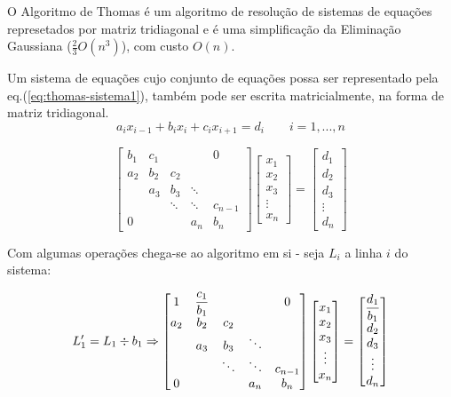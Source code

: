 O Algoritmo de Thomas é um algoritmo de resolução de sistemas de equações represetados por matriz tridiagonal e é uma simplificação da Eliminação Gaussiana ($\frac{2}{3}O(n^3)$), com custo $O(n)$.

Um sistema de equações cujo conjunto de equações possa ser representado pela eq.(\ref{eq:thomas-sistema1}), também pode ser escrita matricialmente, na forma de matriz tridiagonal.
\begin{equation}
\label{eq:thomas-sistema1}
a_i x_{i-1} + b_i x_i + c_i x_{i+1} = d_i \qquad i = 1, ..., n
\end{equation}

\begin{equation*}
	\begin{bmatrix}
		b_1 & c_1 &         &        & 0\\
		a_2 & b_2 &   c_2   &        & \\
		    & a_3 &   b_3   & \ddots & \\
		    &     &  \ddots & \ddots & c_{n-1} \\
	     0  &     &         &  a_n   & b_n 
	\end{bmatrix}
	\begin{bmatrix}
		x_1 \\
		x_2 \\
		x_3 \\
		\vdots \\
		x_n
	\end{bmatrix}
	=\begin{bmatrix}
		d_1 \\
		d_2 \\
		d_3 \\
		\vdots \\
		d_n
	\end{bmatrix}
\end{equation*}

Com algumas operações chega-se ao algoritmo em si - seja $L_i$ a linha $i$ do sistema:

\begin{equation*}
	L_1' = L_1 \divisionsymbol b_1 \Rightarrow
	\begin{bmatrix}
		1 & \dfrac{c_1}{b_1} &         &        & 0\\
		a_2 & b_2 &   c_2   &        & \\
		    & a_3 &   b_3   & \ddots & \\
		    &     &  \ddots & \ddots & c_{n-1} \\
	     0  &     &         &  a_n   & b_n 
	\end{bmatrix}
	\begin{bmatrix}
		x_1 \\
		x_2 \\
		x_3 \\
		\vdots \\
		x_n
	\end{bmatrix}
	=\begin{bmatrix}
		\dfrac{d_1}{b_1} \\
		d_2 \\
		d_3 \\
		\vdots \\
		d_n
	\end{bmatrix}
\end{equation*}

